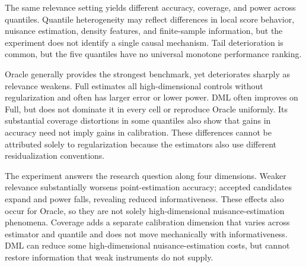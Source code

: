 The same relevance setting yields different accuracy, coverage, and power across quantiles. Quantile heterogeneity may reflect differences in local score behavior, nuisance estimation, density features, and finite-sample information, but the experiment does not identify a single causal mechanism. Tail deterioration is common, but the five quantiles have no universal monotone performance ranking.

Oracle generally provides the strongest benchmark, yet deteriorates sharply as relevance weakens. Full estimates all high-dimensional controls without regularization and often has larger error or lower power. DML often improves on Full, but does not dominate it in every cell or reproduce Oracle uniformly. Its substantial coverage distortions in some quantiles also show that gains in accuracy need not imply gains in calibration. These differences cannot be attributed solely to regularization because the estimators also use different residualization conventions.

The experiment answers the research question along four dimensions. Weaker relevance substantially worsens point-estimation accuracy; accepted candidates expand and power falls, revealing reduced informativeness. These effects also occur for Oracle, so they are not solely high-dimensional nuisance-estimation phenomena. Coverage adds a separate calibration dimension that varies across estimator and quantile and does not move mechanically with informativeness. DML can reduce some high-dimensional nuisance-estimation costs, but cannot restore information that weak instruments do not supply.

\clearpage
